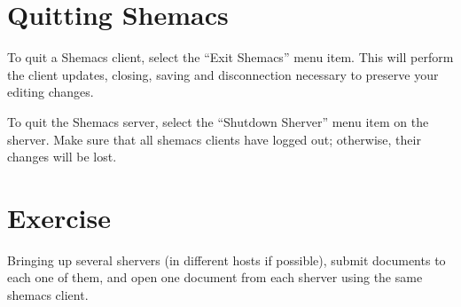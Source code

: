\section{Quitting Shemacs}

To quit a Shemacs client, select the ``Exit Shemacs'' menu item.  This will 
perform the client updates, closing, saving and disconnection necessary to 
preserve your editing changes.

To quit the Shemacs server, select the ``Shutdown Sherver'' menu item on the 
sherver.  Make sure that all shemacs clients have logged out; otherwise, their 
changes will be lost.

\section{Exercise}

Bringing up several shervers (in different hosts if possible), submit 
documents to each one of them, and open one document from each sherver using 
the same shemacs client.






